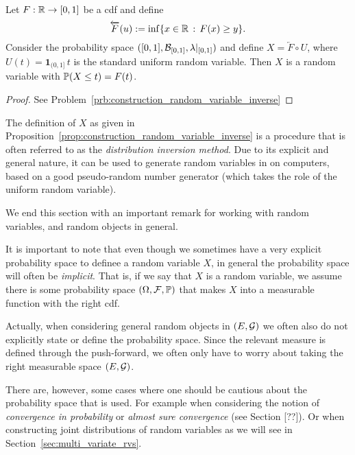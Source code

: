 \begin{proposition}\label{prop:construction_random_variable_inverse}
Let $F : \mathbb R \to [0,1]$ be a cdf and define
\[
	\overleftarrow{F}(u) := \inf\{ x \in \mathbb R \, : \, F(x) \ge y\}.
\]  
Consider the probability space $([0,1], \mathcal B_{[0,1]}, \lambda|_{[0,1]})$ and define $X = \overleftarrow{F}\circ U$, where $U(t) = \mathbf{1}_{(0,1]} \, t$ is the standard uniform random variable. Then $X$ is a random variable with $\mathbb P(X \le t) = F(t)$.
\end{proposition}

\begin{proof}
See Problem~\ref{prb:construction_random_variable_inverse}
\end{proof}

The definition of $X$ as given in Proposition~\ref{prop:construction_random_variable_inverse} is a procedure that is often referred to as the \emph{distribution inversion method}. Due to its explicit and general nature, it can be used to generate random variables in on computers, based on a good pseudo-random number generator (which takes the role of the uniform random variable).

We end this section with an important remark for working with random variables, and random objects in general.

\begin{remark}
It is important to note that even though we sometimes have a very explicit probability space to definee a random variable $X$, in general the probability space will often be \emph{implicit}. That is, if we say that $X$ is a random variable, we assume there is some probability space $(\Omega,\mathcal F, \mathbb P)$ that makes $X$ into a measurable function with the right cdf. 

Actually, when considering general random objects in $(E, \mathcal G)$ we often also do not explicitly state or define the probability space. Since the relevant measure is defined through the push-forward, we often only have to worry about taking the right measurable space $(E, \mathcal G)$.

There are, however, some cases where one should be cautious about the probability space that is used. For example when considering the notion of \emph{convergence in probability} or \emph{almost sure convergence} (see Section [??]). Or when constructing joint distributions of random variables as we will see in Section~\ref{sec:multi_variate_rvs}. 
\end{remark}

